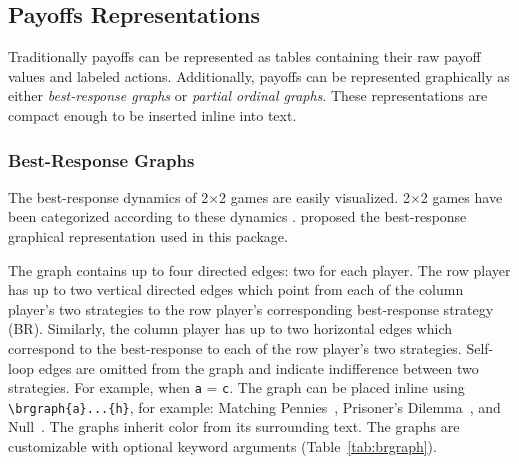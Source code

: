 \documentclass[10pt]{article}
\begin{document}
\subsection{Payoffs Representations}

Traditionally payoffs can be represented as tables containing their raw payoff values and labeled actions. Additionally, payoffs can be represented graphically as either \emph{best-response graphs} or \emph{partial ordinal graphs}. These representations are compact enough to be inserted inline into text.

\subsubsection{Best-Response Graphs}

The best-response dynamics of 2×2 games are easily visualized. 2×2 games have been categorized according to these dynamics \citep{borm1987_classification_of_2x2_games,marris2023_equilibrium_invariant_embedding_2x2_arxiv}. \cite{marris2023_equilibrium_invariant_embedding_2x2_arxiv} proposed the best-response graphical representation used in this package.

The graph contains up to four directed edges: two for each player. The row player has up to two vertical directed edges which point from each of the column player's two strategies to the row player's corresponding best-response strategy (BR). Similarly, the column player has up to two horizontal edges which correspond to the best-response to each of the row player's two strategies. Self-loop edges are omitted from the graph and indicate indifference between two strategies. For example, when \verb!a! = \verb!c!. The graph can be placed inline using \verb!\brgraph{a}...{h}!, for example: Matching Pennies~, Prisoner's Dilemma~, and Null~. The graphs inherit color from its surrounding text. The graphs are customizable with optional keyword arguments (Table~\ref{tab:brgraph}).
\end{document}

